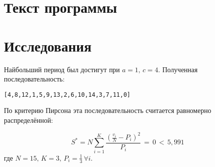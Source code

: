 \documentclass[oneside, final, 12pt]{extarticle}
\begin{document}
\section{Текст программы}

\lstset{caption=Пользовательский интерфейс}


\lstset{caption=Вычисления}


\section{Исследования}
Найбольший период был достигут при \(a=1,\,c=4\). Полученная последовательность:

\begin{verbatim}
[4,8,12,1,5,9,13,2,6,10,14,3,7,11,0]
\end{verbatim}

По критерию Пирсона эта последовательность считается равномерно распределённой:

\[S^*=N\sum_{i=1}^K\frac{(\frac{v_i}{N}-P_i)^2}{P_i}\,=\,0\,<\,5,991\]
где \(N=15,\,K=3,\,P_i=\frac{1}{3}\,\forall i\).
\end{document}
